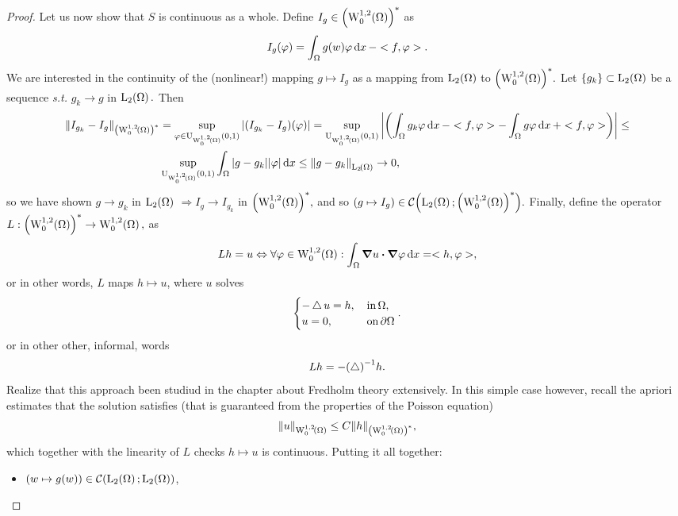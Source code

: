 \documentclass{article}
\begin{document}
\begin{example}
\begin{proof}
		Let us now show that $S$ is continuous as a whole. Define $I_g \in \qty(\WkpzeroSet[1][2]{\Omega})^{*}$ as
		\[
			I_g\qty(\varphi) = \int_{\Omega}g(w) \varphi\dd{x} - <f, \varphi>.
		\]
		We are interested in the continuity of the (nonlinear!) mapping $g \mapsto I_g$ as a mapping from $\LpSet[2]{\Omega}$ to $\qty(\WkpzeroSet[1][2]{\Omega})^{*}.$ Let $\qty{g_k} \subset \LpSet[2]{\Omega}$ be a sequence \textit{s.t.} $g_k \to g$ in  $\LpSet[2]{\Omega}.$ Then
		\begin{align*}
			\norm{I_{g_k}- I_g}_{\qty(\WkpzeroSet[1][2]{\Omega})^{*}} &= \sup_{\varphi \in \text{U}_{\WkpzeroSet[1][2]{\Omega}}(0,1)}\abs{\qty(I_{g_k}-I_g)\qty(\varphi)} = \sup_{\text{U}_{\WkpzeroSet[1][2]{\Omega}}(0,1)}\abs{\qty(\int_{\Omega}g_k \varphi\dd{x} - <f,\varphi> - \int_{\Omega}g \varphi\dd{x}+<f,\varphi>)} \leq \\
										  &\sup_{\text{U}_{\WkpzeroSet[1][2]{\Omega}}(0,1)}\int_{\Omega}\abs{g - g_k}|\varphi|\dd{x} \leq \norm{g-g_k}_{\LpSet[2]{\Omega}} \to 0,
		\end{align*}
		so we have shown $g \to g_k$ in $\LpSet[2]{\Omega}$ $\Rightarrow I_g \to I_{g_k}$ in $\qty(\WkpzeroSet[1][2]{\Omega})^{*},$ and so $\qty(g \mapsto I_g) \in \mathcal{C}\qty(\LpSet[2]{\Omega}; \qty(\WkpzeroSet[1][2]{\Omega})^{*}).$ Finally, define the operator $L: \qty(\WkpzeroSet[1][2]{\Omega})^{*} \to \WkpzeroSet[1][2]{\Omega},$ as
		\[
			Lh = u \Leftrightarrow \forall \varphi \in \WkpzeroSet[1][2]{\Omega}: \int_{\Omega}\grad u \vdot \grad \varphi \dd{x} = <h, \varphi>,
		\]
		or in other words, $L$ maps $h \mapsto u$, where $u$ solves
		\[
			\begin{cases}
				-\operatorname{\bigtriangleup} u = h, & \, \text{in} \, \Omega, \\
				u = 0, & \, \text{on} \, \partial \Omega
			\end{cases}.
		\]
		or in other other, informal, words
		\[
			Lh = - \qty(\operatorname{\bigtriangleup})^{-1}h.
		\]
		Realize that this approach been studiud in the chapter about Fredholm theory extensively. In this simple case however, recall the apriori estimates that the solution satisfies (that is guaranteed from the properties of the Poisson equation)
		\[
			\norm{u}_{\WkpzeroSet[1][2]{\Omega}}\leq C \norm{h}_{\qty(\WkpzeroSet[1][2]{\Omega})^{*}},
		\]
		which together with the linearity of $L$ checks $h \mapsto u$ is continuous. Putting it all together:
		\begin{itemize}
			\item $\qty(w \mapsto g(w)) \in \mathcal{C}\qty(\LpSet[2]{\Omega};\LpSet[2]{\Omega})$,

\end{itemize}
\end{proof}
\end{example}
\end{document}

